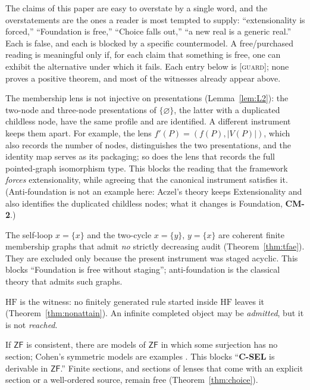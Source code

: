 \documentclass[11pt]{article}
\newcommand{\HF}{\mathrm{HF}}                 \newcommand{\rank}{\operatorname{rank}}
\newcommand{\gradetag}[1]{\textnormal{\textsc{[#1]}}}
\newcommand{\guardg}{\gradetag{guard}}
\theoremstyle{definition}
\begin{document}
The claims of this paper are easy to overstate by a single word, and the overstatements are the
ones a reader is most tempted to supply: ``extensionality is forced,'' ``Foundation is free,''
``Choice falls out,'' ``a new real is a generic real.'' Each is false, and each is blocked by a
specific countermodel. A free/purchased reading is meaningful only if, for each claim that
something is free, one can exhibit the alternative under which it fails. Each entry below is
\guardg{}; none proves a positive theorem, and most of the witnesses already appear above.

\begin{description}[leftmargin=1.2em, itemsep=4pt]

\item[\textbf{CM-1}: Extensionality is a choice of lens.] The membership lens is not injective on
presentations (Lemma~\ref{lem:L2}): the two-node and three-node presentations of
$\{\varnothing\}$, the latter with a duplicated childless node, have the same profile and are
identified. A different instrument keeps them apart. For example, the lens $f'(P)=(f(P),|V(P)|)$,
which also records the number of nodes, distinguishes the two presentations, and the identity map
serves as its packaging; so does the lens that records the full pointed-graph isomorphism type.
This blocks the reading that the framework \emph{forces} extensionality, while agreeing that the
canonical instrument satisfies it. (Anti-foundation is not an example here: Aczel's theory keeps
Extensionality and also identifies the duplicated childless nodes; what it changes is Foundation,
\textbf{CM-2}.)

\item[\textbf{CM-2}: Foundation needs staging.] The self-loop $x=\{x\}$ and the two-cycle
$x=\{y\}$, $y=\{x\}$ are coherent finite membership graphs that admit \emph{no} strictly
decreasing audit (Theorem~\ref{thm:tfae}). They are excluded only because the present instrument
was staged acyclic. This blocks ``Foundation is free without staging''; anti-foundation
\citep{Aczel1988} is the classical theory that admits such graphs.

\item[\textbf{CM-3}: Infinity does not emerge from iteration.] $\HF$ is the witness: no finitely
generated rule started inside $\HF$ leaves it (Theorem~\ref{thm:nonattain}). An infinite completed
object may be \emph{admitted}, but it is not \emph{reached}.

\item[\textbf{CM-4}: Sections are not free infinitarily.] If $\mathsf{ZF}$ is consistent, there
are models of $\mathsf{ZF}$ in which some surjection has no section; Cohen's symmetric models are
examples \citep{Cohen1966,Jech1973}. This blocks ``\textbf{C-SEL} is derivable in $\mathsf{ZF}$.''
Finite sections, and sections of lenses that come with an explicit section or a well-ordered
source, remain free (Theorem~\ref{thm:choice}).


\end{description}
\end{document}
